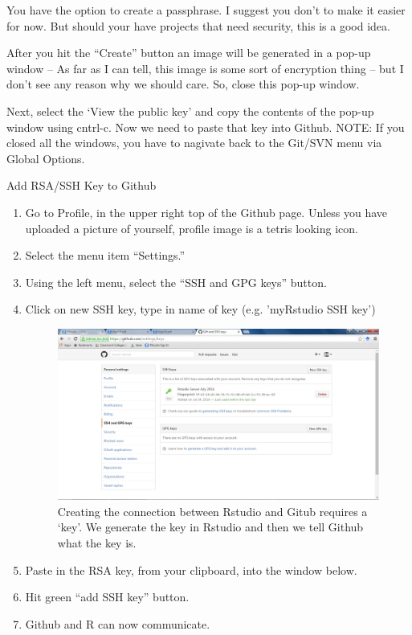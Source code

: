 \documentclass[12pt]{../SOP3_beta}
\begin{document}
\NP You have the option to create a passphrase. I suggest you don't to make it easier for now. But should your have projects that need security, this is a good idea.

\NP After you hit the ``Create'' button an image will be generated in a pop-up window -- As far as I can tell, this image is some sort of encryption thing -- but I don't see any reason why we should care. So, close this pop-up window. 

\NP Next, select the `View the public key' and copy the contents of the pop-up window using cntrl-c. Now we need to paste that key into Github. NOTE: If you closed all the windows, you have to nagivate back to the Git/SVN menu via Global Options. 

\NP Add RSA/SSH Key to Github
  \begin{enumerate}
  \item Go to Profile, in the upper right top of the Github page. Unless you have uploaded a picture of yourself, profile image is a tetris looking icon.
  \item Select the menu item ``Settings.''
  \item Using the left menu, select the ``SSH and GPG keys'' button.
  \item Click on new SSH key, type in name of key (e.g. 'myRstudio SSH key')
  
\begin{figure}
\includegraphics{graphics/Github_SavedSSH.jpg}
\caption{Creating the connection between Rstudio and Gitub requires a `key'. We generate the key in Rstudio and then we tell Github what the key is.}
\end{figure}

  \item Paste in the RSA key, from your clipboard, into the window below.
  \item Hit green ``add SSH key'' button.
  \item Github and R can now communicate.
  \end{enumerate}
\end{document}
